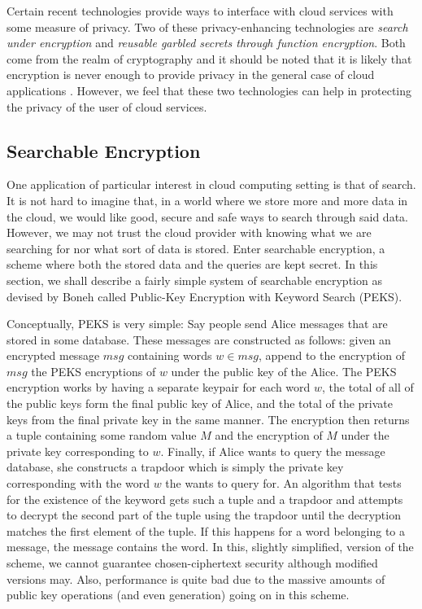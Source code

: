 \documentclass[11pt]{article}
\begin{document}
Certain recent technologies provide ways to interface with cloud services with some measure of privacy.
Two of these privacy-enhancing technologies are \emph{search under encryption} and \emph{reusable garbled secrets through function encryption}.
Both come from the realm of cryptography and it should be noted that it is likely that encryption is never enough to provide privacy in the general case of cloud applications \cite{van2010impossibility}.
However, we feel that these two technologies can help in protecting the privacy of the user of cloud services.

\subsection{Searchable Encryption}

One application of particular interest in cloud computing setting is that of search.
It is not hard to imagine that, in a world where we store more and more data in the cloud, we would like good, secure and safe ways to search through said data.
However, we may not trust the cloud provider with knowing what we are searching for nor what sort of data is stored.
Enter searchable encryption, a scheme where both the stored data and the queries are kept secret.
In this section, we shall describe a fairly simple system of searchable encryption as devised by Boneh \cite{boneh2004public} called Public-Key Encryption with Keyword Search (PEKS).

Conceptually, PEKS is very simple:
Say people send Alice messages that are stored in some database.
These messages are constructed as follows:
given an encrypted message $msg$ containing words $w \in msg$, append to the encryption of $msg$ the PEKS encryptions of $w$ under the public key of the Alice.
The PEKS encryption works by having a separate keypair for each word $w$, the total of all of the public keys form the final public key of Alice, and the total of the private keys  from the final private key in the same manner. The encryption then returns a tuple containing some random value $M$ and the encryption of $M$ under the private key corresponding to $w$.
Finally, if Alice wants to query the message database, she constructs a trapdoor which is simply the private key corresponding with the word $w$ the wants to query for.
An algorithm that tests for the existence of the keyword gets such a tuple and a trapdoor and attempts to decrypt the second part of the tuple using the trapdoor until the decryption matches the first element of the tuple.
If this happens for a word belonging to a message, the message contains the word. 
In this, slightly simplified, version of the scheme, we cannot guarantee chosen-ciphertext security although modified versions may.
Also, performance is quite bad due to the massive amounts of public key operations (and even generation) going on in this scheme.
\end{document}

